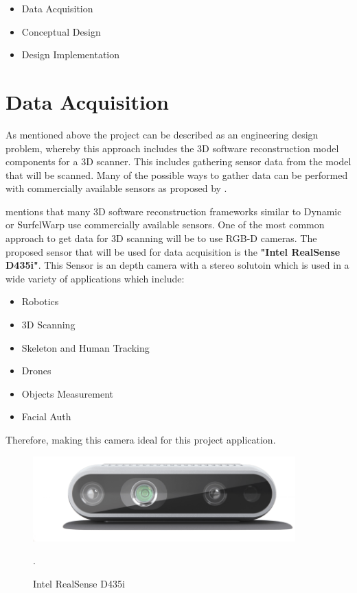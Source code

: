 \documentclass[12pt]{report}
\begin{document}
\begin{itemize}
  \item Data Acquisition
  \item Conceptual Design
  \item Design Implementation
\end{itemize}


\section{Data Acquisition}
As mentioned above the project can be described as an engineering design problem, whereby this approach includes the 3D software reconstruction model components for a 3D scanner. 
This includes gathering sensor data from the model that will be scanned. Many of the possible ways to gather data can be performed with commercially available sensors as proposed by \citet*{article}.

\citet{3D_scann_cultural} mentions that many 3D software reconstruction frameworks similar to Dynamic or SurfelWarp use commercially available sensors.
One of the most common approach to get data for 3D scanning will be to use RGB-D cameras. The proposed sensor that will be used for data acquisition is the 
\textbf{"Intel RealSense D435i"}. This Sensor is an depth camera with a stereo solutoin which is used in a wide variety of applications which include: 
\begin{itemize}
  \item Robotics
  \item 3D Scanning
  \item Skeleton and Human Tracking
  \item Drones
  \item Objects Measurement
  \item Facial Auth
\end{itemize}
\enlargethispage{\baselineskip}
Therefore, making this camera ideal for this project application.
\begin{figure}[h]
  \centering
  \includegraphics[width=0.9\textwidth]{d435i-1.png}
  \caption{Intel RealSense D435i}\citep*{intelrealsense}.
  \label{fig:d435i}
\end{figure}
\end{document}

